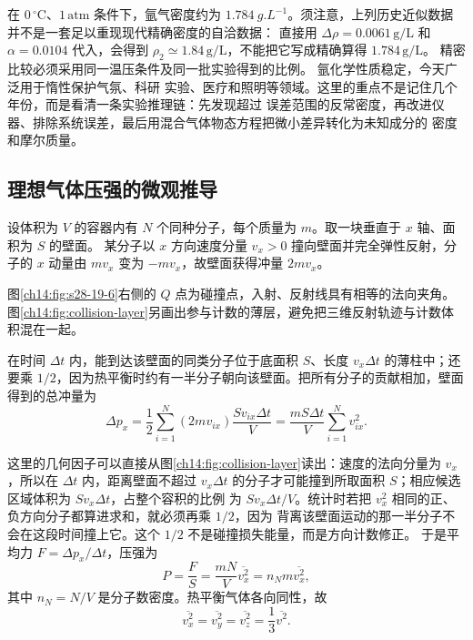 在 $0\,{}^\circ\mathrm C$、$1\,\mathrm{atm}$ 条件下，氩气密度约为 $\SI{1.784}{g.L^{-1}}$。须注意，上列历史近似数据并不是一套足以重现现代精确密度的自洽数据：
直接用 $\Delta\rho=0.0061\,\mathrm{g/L}$ 和 $\alpha=0.0104$ 代入，会得到
$\rho_2\simeq1.84\,\mathrm{g/L}$，不能把它写成精确算得 $1.784\,\mathrm{g/L}$。
精密比较必须采用同一温压条件及同一批实验得到的比例。
氩化学性质稳定，今天广泛用于惰性保护气氛、科研
实验、医疗和照明等领域。这里的重点不是记住几个年份，而是看清一条实验推理链：先发现超过
误差范围的反常密度，再改进仪器、排除系统误差，最后用混合气体物态方程把微小差异转化为未知成分的
密度和摩尔质量。

\subsection{理想气体压强的微观推导}\label{ch14:sec:pressure}

设体积为 $V$ 的容器内有 $N$ 个同种分子，每个质量为 $m$。取一块垂直于 $x$ 轴、面积为 $S$ 的壁面。
某分子以 $x$ 方向速度分量 $v_x>0$ 撞向壁面并完全弹性反射，分子的 $x$ 动量由 $mv_x$ 变为
$-mv_x$，故壁面获得冲量 $2mv_x$。

\figureNineteenSixFaithful

图\ref{ch14:fig:s28-19-6}右侧的 $Q$ 点为碰撞点，入射、反射线具有相等的法向夹角。
图\ref{ch14:fig:collision-layer}另画出参与计数的薄层，避免把三维反射轨迹与计数体积混在一起。
\gasWallCollisionDiagram

在时间 $\Delta t$ 内，能到达该壁面的同类分子位于底面积 $S$、长度 $v_x\Delta t$ 的薄柱中；还要乘
$1/2$，因为热平衡时约有一半分子朝向该壁面。把所有分子的贡献相加，壁面得到的总冲量为
\begin{equation}
  \Delta p_x=\frac12\sum_{i=1}^N(2mv_{ix})
  \frac{Sv_{ix}\Delta t}{V}
  =\frac{mS\Delta t}{V}\sum_{i=1}^Nv_{ix}^2.
\end{equation}

这里的几何因子可以直接从图\ref{ch14:fig:collision-layer}读出：速度的法向分量为 $v_x$，所以在 $\Delta t$ 内，距离壁面不超过
$v_x\Delta t$ 的分子才可能撞到所取面积 $S$；相应候选区域体积为 $Sv_x\Delta t$，占整个容积的比例
为 $Sv_x\Delta t/V$。统计时若把 $v_x^2$ 相同的正、负方向分子都算进求和，就必须再乘 $1/2$，因为
背离该壁面运动的那一半分子不会在这段时间撞上它。这个 $1/2$ 不是碰撞损失能量，而是方向计数修正。
于是平均力 $F=\Delta p_x/\Delta t$，压强为
\begin{equation}
  \boxed{P=\frac FS=\frac{mN}{V}\overline{v_x^2}
  =n_Nm\overline{v_x^2}},
\end{equation}
其中 $n_N=N/V$ 是分子数密度。热平衡气体各向同性，故
\begin{equation}
  \overline{v_x^2}=\overline{v_y^2}=\overline{v_z^2}
  =\frac13\overline{v^2}.
\end{equation}

